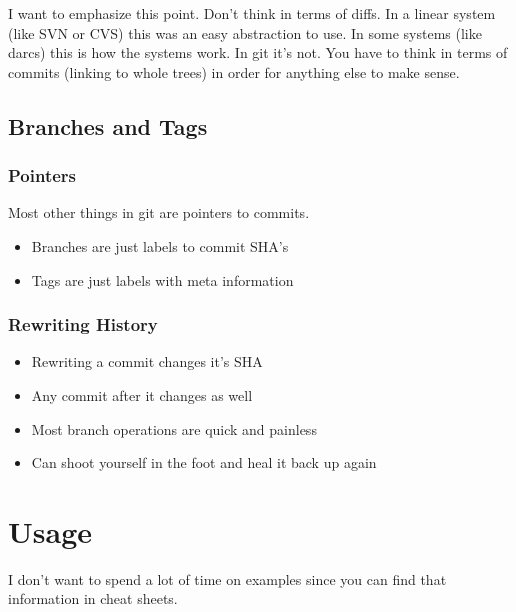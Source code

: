 I want to emphasize this point. Don't think in terms of diffs. In a linear
system (like SVN or CVS) this was an easy abstraction to use. In some systems
(like darcs) this is how the systems work. In git it's not. You have to think in
terms of commits (linking to whole trees) in order for anything else to make
sense.

\subsection{Branches and Tags}

\begin{frame}
  \frametitle{Pointers}
  Most other things in git are pointers to commits.
  \begin{itemize}
  \item Branches are just labels to commit SHA's
  \item Tags are just labels with meta information
  \end{itemize}
\end{frame}

\begin{frame}
  \frametitle{Rewriting History}
  \begin{itemize}
  \item Rewriting a commit changes it's SHA
    \pause
  \item Any commit after it changes as well
    \pause
  \item Most branch operations are quick and painless
    \pause
  \item Can shoot yourself in the foot and heal it back up again
  \end{itemize}
\end{frame}

\section{Usage}

I don't want to spend a lot of time on examples since you can find that
information in cheat sheets.

